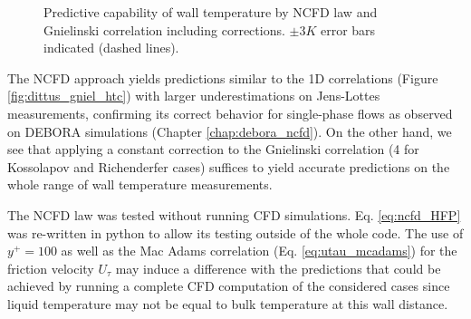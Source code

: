 \begin{figure}[h!]
\centering
{} 
\caption{Predictive capability of wall temperature by NCFD law and Gnielinski correlation including corrections. $\pm 3K$ error bars indicated (dashed lines).}
\label{fig:ncfd_gniel_corr_htc}
\end{figure}

\npar
The NCFD approach yields predictions similar to the 1D correlations (Figure \ref{fig:dittus_gniel_htc}) with larger underestimations on Jens-Lottes measurements, confirming its correct behavior for single-phase flows as observed on DEBORA simulations (Chapter \ref{chap:debora_ncfd}). On the other hand, we see that applying a constant correction to the Gnielinski correlation (4 for Kossolapov and Richenderfer cases) suffices to yield accurate predictions on the whole range of wall temperature measurements. 

\begin{remark*}{}
The NCFD law was tested without running CFD simulations. Eq. \ref{eq:ncfd_HFP} was re-written in python to allow its testing outside of the whole code. The use of $y^{+}=100$ as well as the Mac Adams correlation (Eq. \ref{eq:utau_mcadams}) for the friction velocity $U_{\tau}$ may induce a difference with the predictions that could be achieved by running a complete CFD computation of the considered cases since liquid temperature may not be equal to bulk temperature at this wall distance. 
\end{remark*}

